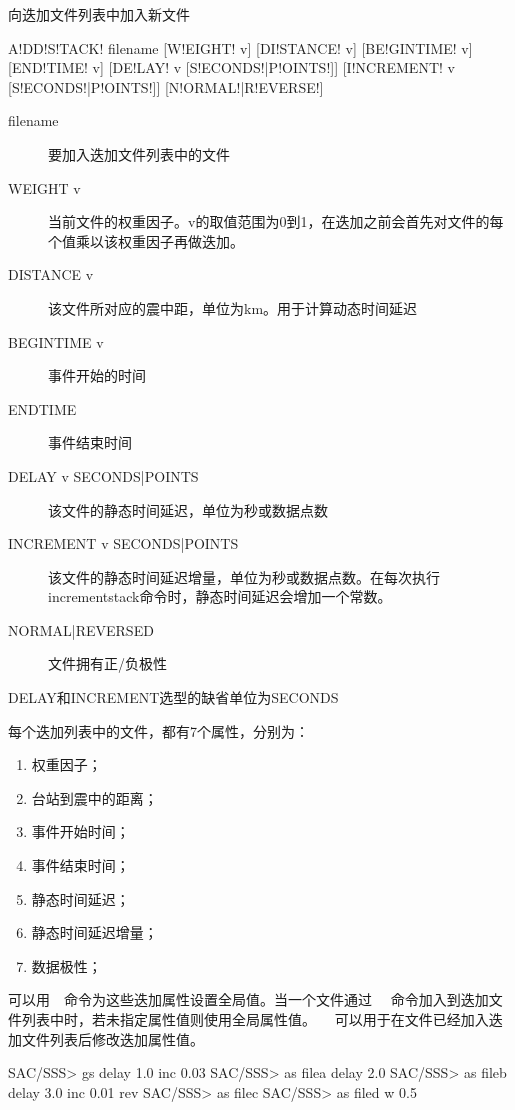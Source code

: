\label{sss:addstack}

向迭加文件列表中加入新文件

\begin{SACSTX}
A!DD!S!TACK! filename [W!EIGHT! v] [DI!STANCE! v]
    [BE!GINTIME! v] [END!TIME! v]
    [DE!LAY! v [S!ECONDS!|P!OINTS!]]
    [I!NCREMENT! v [S!ECONDS!|P!OINTS!]]
    [N!ORMAL!|R!EVERSE!]
\end{SACSTX}

\begin{description}
\item [filename] 要加入迭加文件列表中的文件
\item [WEIGHT v] 当前文件的权重因子。v的取值范围为0到1，在迭加之前会首先对文件的每个值乘以该权重因子再做迭加。
\item [DISTANCE v] 该文件所对应的震中距，单位为km。用于计算动态时间延迟
\item [BEGINTIME v] 事件开始的时间
\item [ENDTIME] 事件结束时间
\item [DELAY v SECONDS|POINTS] 该文件的静态时间延迟，单位为秒或数据点数
\item [INCREMENT v SECONDS|POINTS] 该文件的静态时间延迟增量，单位为秒或数据点数。在每次执行incrementstack命令时，静态时间延迟会增加一个常数。
\item [NORMAL|REVERSED] 文件拥有正/负极性
\end{description}

DELAY和INCREMENT选型的缺省单位为SECONDS

每个迭加列表中的文件，都有7个属性，分别为：
\begin{enumerate}
\item 权重因子；
\item 台站到震中的距离；
\item 事件开始时间；
\item 事件结束时间；
\item 静态时间延迟；
\item 静态时间延迟增量；
\item 数据极性；
\end{enumerate}

可以用~~命令为这些迭加属性设置全局值。当一个文件通过
~~命令加入到迭加文件列表中时，若未指定属性值则使用全局属性值。
~~可以用于在文件已经加入迭加文件列表后修改迭加属性值。

\begin{SACCode}
SAC/SSS> gs delay 1.0 inc 0.03
SAC/SSS> as filea delay 2.0
SAC/SSS> as fileb delay 3.0 inc 0.01 rev
SAC/SSS> as filec
SAC/SSS> as filed w 0.5
\end{SACCode}

